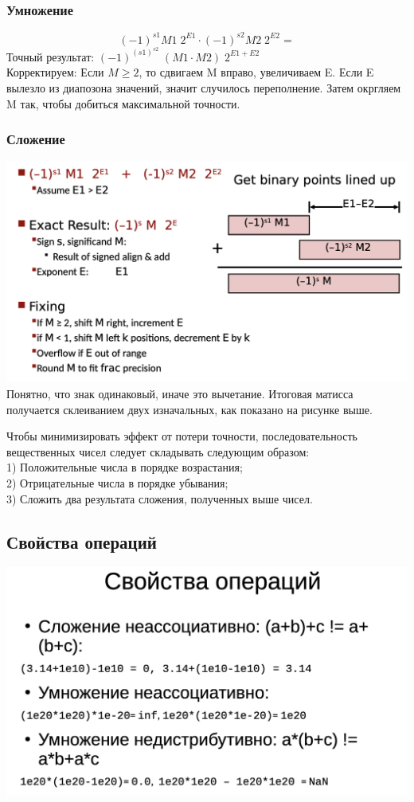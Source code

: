 \documentclass[12pt]{article}
\begin{document}
\subsubsection*{Умножение}
$$(-1)^{s1}M1 \; 2^{E1} \cdot (-1)^{s2}M2 \; 2^{E2} = $$
Точный результат: $(-1)^{(s1)^{s2}}\; (M1 \cdot M2) \; 2^{E1 + E2} $ \\
Корректируем: Если $M \geqslant 2$, то сдвигаем M вправо, увеличиваем E. Если E вылезло из диапозона значений, значит случилось переполнение. Затем окргляем M так, чтобы добиться максимальной точности. 

\subsubsection*{Сложение}
 \includegraphics[scale=0.4]{./addition.png} \\
 Понятно, что знак одинаковый, иначе это вычетание. Итоговая матисса получается склеиванием двух изначальных, как показано на рисунке выше.

Чтобы минимизировать эффект от потери точности, последовательность вещественных чисел следует складывать следующим образом: \\
1) Положительные числа в порядке возрастания; \\
2) Отрицательные числа в порядке убывания; \\
3) Сложить два результата сложения, полученных выше чисел. 
 
 \subsection{Свойства операций}
  \includegraphics[scale=0.4]{./pic01.png} 
  
\end{document}
